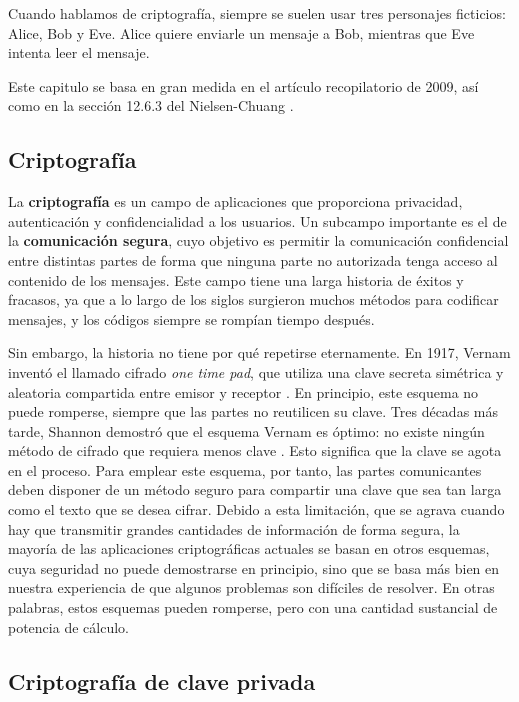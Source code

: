 \documentclass[a4paper,11pt]{book} %
\numberwithin{equation}{chapter}
\begin{document}
Cuando hablamos de criptografía, siempre se suelen usar tres personajes ficticios: Alice, Bob y Eve. Alice quiere enviarle un mensaje a Bob, mientras que Eve intenta leer el mensaje. 

Este capitulo se basa en gran medida en el artículo recopilatorio \cite{QKD_resumen} de 2009, así como en la sección 12.6.3 del Nielsen-Chuang \cite{nielsen_chuang_2010}.

	\subsection{Criptografía}
	
	La \textbf{criptografía} es un campo de aplicaciones que proporciona privacidad, autenticación y confidencialidad a los usuarios. Un subcampo importante es el de la \textbf{comunicación segura}, cuyo objetivo es permitir la comunicación confidencial entre distintas partes de forma que ninguna parte no autorizada tenga acceso al contenido de los mensajes. Este campo tiene una larga historia de éxitos y fracasos, ya que a lo largo de los siglos surgieron muchos métodos para codificar mensajes, y los códigos siempre se rompían tiempo después.

Sin embargo, la historia no tiene por qué repetirse eternamente. En 1917, Vernam inventó el llamado cifrado \textit{one time pad}, que utiliza una clave secreta simétrica y aleatoria compartida entre emisor y receptor \cite{Vernam-1926}. En principio, este esquema no puede romperse, siempre que las partes no reutilicen su clave. Tres décadas más tarde, Shannon demostró que el esquema Vernam es óptimo: no existe ningún método de cifrado que requiera menos clave \cite{Shannon-1949}. Esto significa que la clave se agota en el proceso. Para emplear este esquema, por tanto, las partes comunicantes deben disponer de un método seguro para compartir una clave que sea tan larga como el texto que se desea cifrar. Debido a esta limitación, que se agrava cuando hay que transmitir grandes cantidades de información de forma segura, la mayoría de las aplicaciones criptográficas actuales se basan en otros esquemas, cuya seguridad no puede demostrarse en principio, sino que se basa más bien en nuestra experiencia de que algunos problemas son difíciles de resolver. En otras palabras, estos esquemas pueden romperse, pero con una cantidad sustancial de potencia de cálculo. 

		\subsection{Criptografía de clave privada}
	
\end{document}
